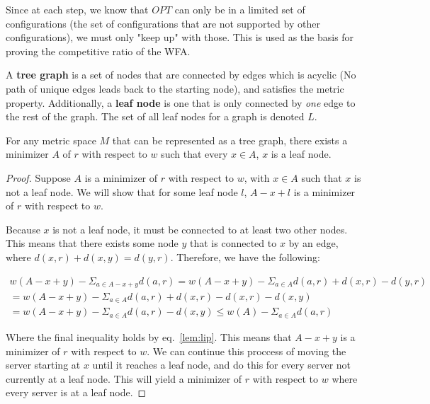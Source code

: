 Since at each step, we know that $OPT$ can only be in a limited set of configurations (the set of configurations that are not supported by other configurations), we must only "keep up" with those. This is used as the basis for proving the competitive ratio of the WFA.

\begin{definition}
    A \textbf{tree graph} is a set of nodes that are connected by edges which is acyclic (No path of unique edges leads back to the starting node), and satisfies the metric property. Additionally, a \textbf{leaf node} is one that is only connected by \textit{one} edge to the rest of the graph. The set of all leaf nodes for a graph is denoted $L$.
\end{definition}

\begin{lemma}
    \label{lem:leaf}
    For any metric space $M$ that can be represented as a tree graph, there exists a minimizer $A$ of $r$ with respect to $w$ such that every $x \in A$, $x$ is a leaf node.
\end{lemma}

\begin{proof}
    Suppose $A$ is a minimizer of $r$ with respect to $w$, with $x \in A$ such that $x$ is not a leaf node. We will show that for some leaf node $l$, $A-x+l$ is a minimizer of $r$ with respect to $w$. 

    Because $x$ is not a leaf node, it must be connected to at least two other nodes. This means that there exists some node $y$ that is connected to $x$ by an edge, where $d(x,r) + d(x,y) = d(y,r)$. Therefore, we have the following:

    \begin{equation*}
        \begin{gathered}
            w(A-x+y) - \Sigma_{a \in A-x+y} d(a,r) = w(A-x+y) - \Sigma_{a \in A} d(a,r) + d(x,r) - d(y,r) \\
            = w(A-x+y) - \Sigma_{a \in A} d(a,r) + d(x,r) - d(x,r) - d(x,y)\\
            = w(A-x+y) - \Sigma_{a \in A} d(a,r) - d(x,y) \leq w(A) - \Sigma_{a \in A} d(a,r)
        \end{gathered}
    \end{equation*}

    Where the final inequality holds by eq.~\ref{lem:lip}. This means that $A-x+y$ is a minimizer of $r$ with respect to $w$. We can continue this proccess of moving the server starting at $x$ until it reaches a leaf node, and do this for every server not currently at a leaf node. This will yield a minimizer of $r$ with respect to $w$ where every server is at a leaf node.
\end{proof}